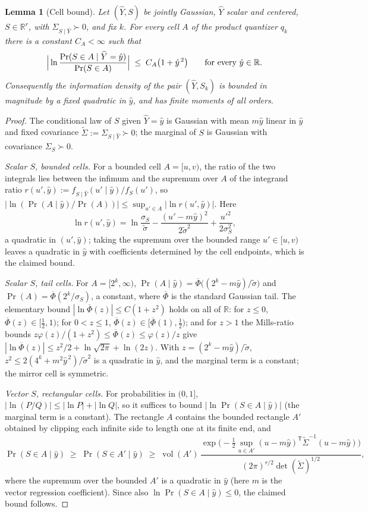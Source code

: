 ﻿\documentclass[11pt,onecolumn]{IEEEtran}
\newtheorem{lemma}[theorem]{Lemma}
\newcommand{\R}{\mathbb{R}}
\newcommand{\hY}{\widehat{Y}}
\begin{document}
\begin{lemma}[Cell bound]\label{lem:cellbound}
Let $(\hY,S)$ be jointly Gaussian, $\hY$ scalar and centered, $S\in\R^r$,
with $\Sigma_{S\mid\hY}\succ0$, and fix $k$. For every cell $A$ of the
product quantizer $q_k$ there is a constant $C_A<\infty$ such that
\[
\Bigl|\,\ln\frac{\Pr(S\in A\mid\hY=\hat y)}{\Pr(S\in A)}\Bigr|
\;\le\;C_A\bigl(1+\hat y^{\,2}\bigr)
\qquad\text{for every }\hat y\in\R .
\]
Consequently the information density of the pair $(\hY,S_k)$ is bounded
in magnitude by a fixed quadratic in $\hat y$, and has finite moments
of all orders.
\end{lemma}

\begin{proof}
The conditional law of $S$ given $\hY=\hat y$ is Gaussian with mean
$m\hat y$ linear in $\hat y$ and fixed covariance
$\widetilde\Sigma:=\Sigma_{S\mid\hY}\succ0$; the marginal of $S$ is
Gaussian with covariance $\Sigma_S\succ0$.

\emph{Scalar $S$, bounded cells.} For a bounded cell $A=[u,v)$, the
ratio of the two integrals lies between the infimum and the supremum
over $A$ of the integrand ratio
$r(u',\hat y):=f_{S\mid\hY}(u'\mid\hat y)/f_S(u')$, so
$|\ln(\Pr(A\mid\hat y)/\Pr(A))|\le\sup_{u'\in A}|\ln r(u',\hat y)|$.
Here
\[
\ln r(u',\hat y)
=\ln\frac{\sigma_S}{\widetilde\sigma}
-\frac{(u'-m\hat y)^2}{2\widetilde\sigma^2}
+\frac{u'^2}{2\sigma_S^2},
\]
a quadratic in $(u',\hat y)$; taking the supremum over the bounded
range $u'\in[u,v)$ leaves a quadratic in $\hat y$ with coefficients
determined by the cell endpoints, which is the claimed bound.

\emph{Scalar $S$, tail cells.} For $A=[2^k,\infty)$,
$\Pr(A\mid\hat y)=\overline\Phi\bigl((2^k-m\hat y)/\widetilde\sigma\bigr)$
and $\Pr(A)=\overline\Phi(2^k/\sigma_S)$, a constant, where
$\overline\Phi$ is the standard Gaussian tail. The elementary bound
$|\ln\overline\Phi(z)|\le C(1+z^2)$ holds on all of $\R$: for
$z\le0$, $\overline\Phi(z)\in[\tfrac12,1)$; for $0<z\le1$,
$\overline\Phi(z)\in[\overline\Phi(1),\tfrac12)$; and for $z>1$ the
Mills-ratio bounds
$z\varphi(z)/(1+z^2)\le\overline\Phi(z)\le\varphi(z)/z$ give
$|\ln\overline\Phi(z)|\le z^2/2+\ln\sqrt{2\pi}+\ln(2z)$. With
$z=(2^k-m\hat y)/\widetilde\sigma$, $z^2\le2(4^k+m^2\hat
y^{\,2})/\widetilde\sigma^2$ is a quadratic in $\hat y$, and the
marginal term is a constant; the mirror cell is symmetric.

\emph{Vector $S$, rectangular cells.} For probabilities in $(0,1]$,
$|\ln(P/Q)|\le|\ln P|+|\ln Q|$, so it suffices to bound
$|\ln\Pr(S\in A\mid\hat y)|$ (the marginal term is a constant). The
rectangle $A$ contains the bounded rectangle $A'$ obtained by clipping
each infinite side to length one at its finite end, and
\[
\Pr(S\in A\mid\hat y)\;\ge\;\Pr(S\in A'\mid\hat y)
\;\ge\;\operatorname{vol}(A')\,
\frac{\exp\bigl(-\tfrac12\sup_{u\in A'}
(u-m\hat y)^{\mathsf T}\widetilde\Sigma^{-1}(u-m\hat y)\bigr)}
{(2\pi)^{r/2}\det(\widetilde\Sigma)^{1/2}},
\]
where the supremum over the bounded $A'$ is a quadratic in $\hat y$
(here $m$ is the vector regression coefficient). Since also
$\ln\Pr(S\in A\mid\hat y)\le0$, the claimed bound follows.


\end{proof}
\end{document}
